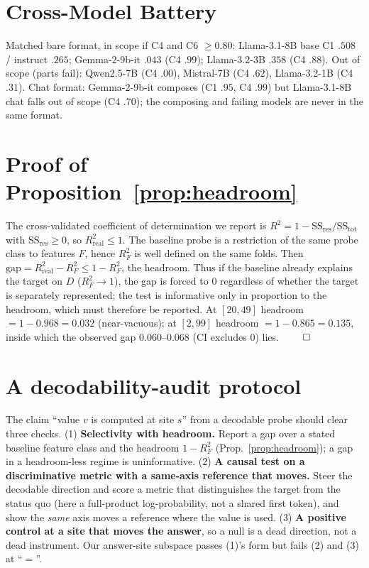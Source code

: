 \section{Cross-Model Battery}
\label{app:crossmodel}
Matched bare format, in scope if C4 and C6 $\geq 0.80$: Llama-3.1-8B base C1 $.508$ /
instruct $.265$; Gemma-2-9b-it $.043$ (C4 $.99$); Llama-3.2-3B $.358$ (C4 $.88$). Out of
scope (parts fail): Qwen2.5-7B (C4 $.00$), Mistral-7B (C4 $.62$), Llama-3.2-1B (C4 $.31$).
Chat format: Gemma-2-9b-it composes (C1 $.95$, C4 $.99$) but Llama-3.1-8B chat falls out of
scope (C4 $.70$); the composing and failing models are never in the same format.

\section{Proof of Proposition~\ref{prop:headroom}}
\label{app:proof}
The cross-validated coefficient of determination we report is $R^2 = 1 - \mathrm{SS_{res}}/\mathrm{SS_{tot}}$
with $\mathrm{SS_{res}} \ge 0$, so $R^2_{\mathrm{real}} \le 1$. The baseline probe is a restriction
of the same probe class to features $F$, hence $R^2_{F}$ is well defined on the same folds. Then
$\mathrm{gap} = R^2_{\mathrm{real}} - R^2_{F} \le 1 - R^2_{F}$, the headroom. Thus if the baseline
already explains the target on $D$ ($R^2_F \to 1$), the gap is forced to $0$ regardless of whether
the target is separately represented; the test is informative only in proportion to the headroom,
which must therefore be reported. At $[20,49]$ headroom $= 1 - 0.968 = 0.032$ (near-vacuous); at
$[2,99]$ headroom $= 1 - 0.865 = 0.135$, inside which the observed gap $0.060$--$0.068$ (CI excludes
$0$) lies. $\qed$

\section{A decodability-audit protocol}
\label{app:audit}
The claim ``value $v$ is computed at site $s$'' from a decodable probe should clear three checks.
(1) \textbf{Selectivity with headroom.} Report a gap over a stated baseline feature class and the
headroom $1 - R^2_F$ (Prop.~\ref{prop:headroom}); a gap in a headroom-less regime is uninformative.
(2) \textbf{A causal test on a discriminative metric with a same-axis reference that moves.} Steer
the decodable direction and score a metric that distinguishes the target from the status quo (here
a full-product log-probability, not a shared first token), and show the \emph{same} axis moves a
reference where the value is used. (3) \textbf{A positive control at a site that moves the answer},
so a null is a dead direction, not a dead instrument. Our answer-site subspace passes (1)'s form
but fails (2) and (3) at ``$=$''.

